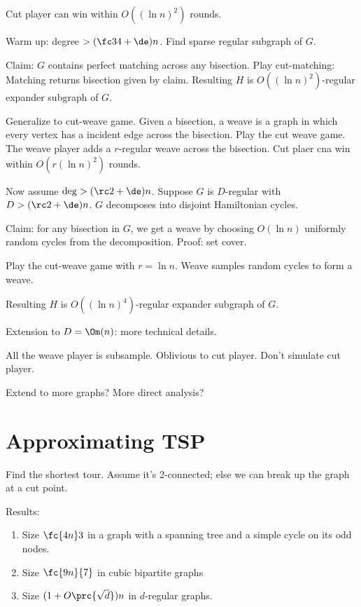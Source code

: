 Cut player can win within $O((\ln n)^2)$ rounds.

Warm up: degree $>(\fc34+\de)n$. Find sparse regular subgraph of $G$. 

Claim: $G$ contains perfect matching across any bisection. Play cut-matching: Matching returns bisection given by claim. Resulting $H$ is $O((\ln n)^2)$-regular expander subgraph of $G$.

Generalize to cut-weave game.
Given a bisection, a weave is a graph in which every vertex has a incident edge across the bisection.
Play the cut weave game. The weave player adds a $r$-regular weave across the bisection.
Cut plaer cna win within $O(r(\ln n)^2)$ rounds.

Now assume $\deg>(\rc2+\de)n$. Suppose $G$ is $D$-regular with $D>(\rc2+\de)n$. $G$ decomposes into disjoint Hamiltonian cycles.

Claim: for any bisection in $G$, we get a weave by choosing $O(\ln n)$ uniformly random cycles from the decomposition. Proof: set cover.

Play the cut-weave game with $r=\ln n$. Weave samples random cycles to form a weave.

Resulting $H$ is $O((\ln n)^4)$-regular expander subgraph of $G$.

Extension to $D=\Om(n)$: more technical details.


All the weave player is subsample. Oblivious to cut player. Don't simulate cut player.

Extend to more graphs? More direct analysis?

\section{Approximating TSP}

Find the shortest tour. 
Assume it's 2-connected; else we can break up the graph at a cut point.

Results:
\begin{enumerate}
\item
Size $\fc{4n}3$ in a graph with a spanning tree and a simple cycle on its odd nodes.
\item
Size $\fc{9n}{7}$ in cubic bipartite graphs
\item
Size $(1+O\prc{\sqrt d})n$ in $d$-regular graphs.
\end{enumerate}

